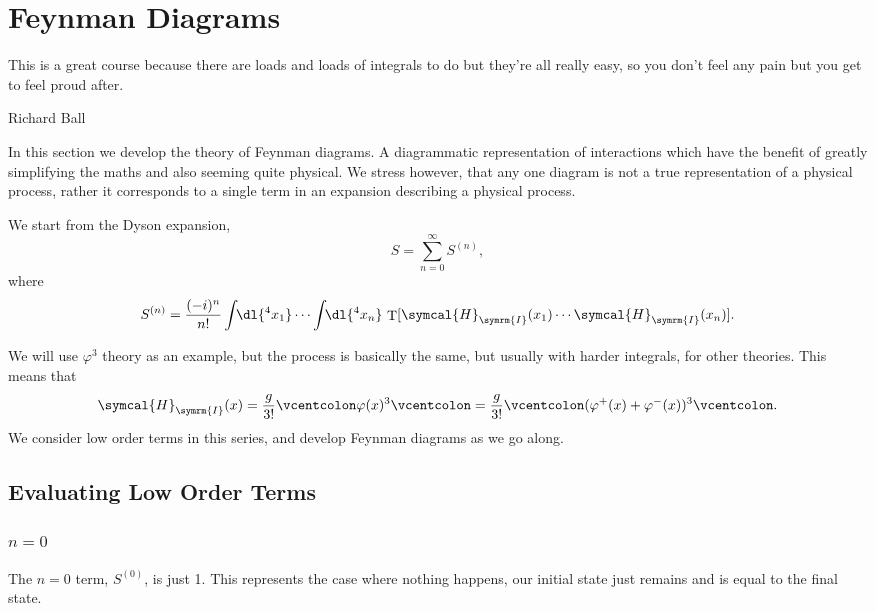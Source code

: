 \documentclass[fleqn]{NotesClass}
\newcommand{\hamiltonianDensity}{\symcal{H}}
\newcommand{\normalordering}[1]{\mathopen{\vcentcolon}{#1}\mathclose{\vcentcolon}}
\newcommand{\interaction}{\symrm{I}}
\DeclareMathOperator{\timeOrdering}{T}
\begin{document}
    \chapter{Feynman Diagrams}
    \label{chap:feynman diagrams}
    \epigraph{This is a great course because there are loads and loads of integrals to do but they're all really easy, so you don't feel any pain but you get to feel proud after.}{Richard Ball}
    In this section we develop the theory of Feynman diagrams.
    A diagrammatic representation of interactions which have the benefit of greatly simplifying the maths and also seeming quite physical.
    We stress however, that any one diagram is not a true representation of a physical process, rather it corresponds to a single term in an expansion describing a physical process.
    
    We start from the Dyson expansion,
    \begin{equation}
        S = \sum_{n = 0}^{\infty} S^{(n)},
    \end{equation}
    where
    \begin{equation}
        S^{(n)} = \frac{(-i)^n}{n!} \int \!\! \dl{^4x_1} \dotsm \int \!\! \dl{^4x_n} \, \timeOrdering[\hamiltonianDensity_{\interaction}(x_1) \dotsm \hamiltonianDensity_{\interaction}(x_n)].
    \end{equation}

    We will use \(\varphi^3\) theory as an example, but the process is basically the same, but usually with harder integrals, for other theories.
    This means that
    \begin{equation}
        \hamiltonianDensity_{\interaction}(x) = \frac{g}{3!} \normalordering{\varphi(x)^3} = \frac{g}{3!}\normalordering{(\varphi^+(x) + \varphi^-(x))^3}.
    \end{equation}
    We consider low order terms in this series, and develop Feynman diagrams as we go along.
    
    \section{Evaluating Low Order Terms}
    \subsection{\texorpdfstring{\(n = 0\)}{n = 0}}
    The \(n = 0\) term, \(S^{(0)}\), is just 1.
    This represents the case where nothing happens, our initial state just remains and is equal to the final state.
    
\end{document}
